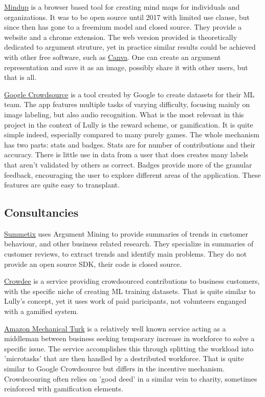 \documentclass{article}
\begin{document}
\href{https://www.mindmup.com/}{Mindup} is a browser based tool for creating mind maps for individuals and organizations. It was to be open source until 2017 with limited use clause, but since then has gone to a freemium model and closed source. They provide a website and a chrome extension. The web version provided is theoretically dedicated to argument struture, yet in practice similar results could be achieved with other free software, such as \href{https://www.canva.com/}{Canva}. One can create an argument representation and save it as an image, possibly share it with other users, but that is all.

\href{https://en.wikipedia.org/wiki/Crowdsource_(app)}{Google Crowdsource} is a tool created by Google to create datasets for their ML team. The app features multiple tasks of varying difficulty, focusing mainly on image labeling, but also audio recognition. What is the most relevant in this project in the context of Lully is the reward scheme, or gamification. It is quite simple indeed, especially compared to many purely games. The whole mechanism has two parts: stats and badges. Stats are for number of contributions and their accuracy. There is little use in data from a user that does creates many labels that aren't validated by others as correct. Badges provide more of the granular feedback, encouraging the user to explore different areas of the application. These features are quite easy to transplant.

\subsection{Consultancies}
\href{https://www.summetix.com/}{Summetix} uses Argument Mining to provide summaries of trends in customer behaviour, and other business related research. They specialize in summaries of customer reviews, to extract trends and identify main problems. They do not provide an open source SDK, their code is closed source.

\href{https://www.crowdee.com/}{Crowdee} is a service providing crowdsourced contributions to business customers, with the specific niche of creating ML training datasets. That is quite similar to Lully's concept, yet it uses work of paid paricipants, not volunteers enganged with a gamified system.

\href{https://www.mturk.com/}{Amazon Mechanical Turk} is a relatively well known service acting as a middleman between business seeking temporary increase in workforce to solve a specific issue.
The service accomplishes this through splitting the workload into 'microtasks' that are then handled by a destributed workforce. That is quite similar to Google Crowdsource but differs in the incentive mechanism. Crowdscouring often relies on 'good deed' in a similar vein to charity, sometimes reinforced with gamification elements.
\end{document}
